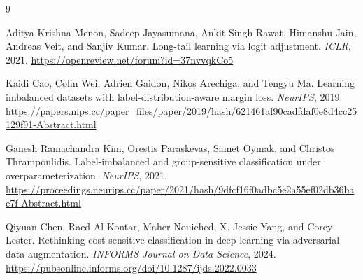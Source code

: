 \documentclass[11pt]{article}
\begin{document}
\begin{thebibliography}{9}

Aditya Krishna Menon, Sadeep Jayasumana, Ankit Singh Rawat, Himanshu Jain, Andreas Veit, and Sanjiv Kumar.
\newblock Long-tail learning via logit adjustment.
\newblock \emph{ICLR}, 2021.
\newblock \url{https://openreview.net/forum?id=37nvvqkCo5}

Kaidi Cao, Colin Wei, Adrien Gaidon, Nikos Arechiga, and Tengyu Ma.
\newblock Learning imbalanced datasets with label-distribution-aware margin loss.
\newblock \emph{NeurIPS}, 2019.
\newblock \url{https://papers.nips.cc/paper_files/paper/2019/hash/621461af90cadfdaf0e8d4cc25129f91-Abstract.html}

Ganesh Ramachandra Kini, Orestis Paraskevas, Samet Oymak, and Christos Thrampoulidis.
\newblock Label-imbalanced and group-sensitive classification under overparameterization.
\newblock \emph{NeurIPS}, 2021.
\newblock \url{https://proceedings.neurips.cc/paper/2021/hash/9dfcf16f0adbc5e2a55ef02db36bac7f-Abstract.html}

Qiyuan Chen, Raed Al Kontar, Maher Nouiehed, X. Jessie Yang, and Corey Lester.
\newblock Rethinking cost-sensitive classification in deep learning via adversarial data augmentation.
\newblock \emph{INFORMS Journal on Data Science}, 2024.
\newblock \url{https://pubsonline.informs.org/doi/10.1287/ijds.2022.0033}

\end{thebibliography}
\end{document}
